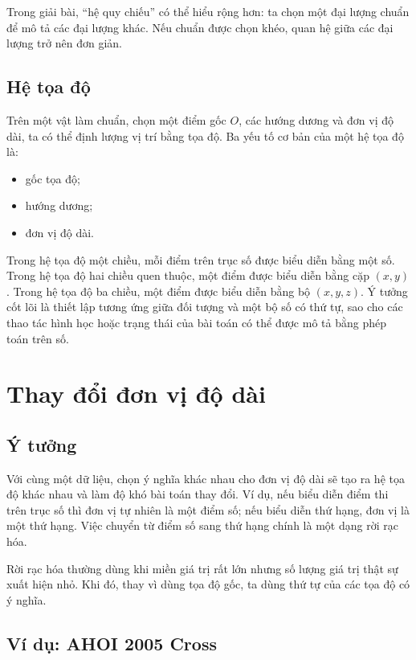 \documentclass[11pt]{article}
\begin{document}
Trong giải bài, ``hệ quy chiếu'' có thể hiểu rộng hơn: ta chọn một đại lượng
chuẩn để mô tả các đại lượng khác. Nếu chuẩn được chọn khéo, quan hệ giữa các
đại lượng trở nên đơn giản.

\subsection{Hệ tọa độ}

Trên một vật làm chuẩn, chọn một điểm gốc \(O\), các hướng dương và đơn vị độ
dài, ta có thể định lượng vị trí bằng tọa độ. Ba yếu tố cơ bản của một hệ tọa
độ là:
\begin{itemize}
  \item gốc tọa độ;
  \item hướng dương;
  \item đơn vị độ dài.
\end{itemize}

Trong hệ tọa độ một chiều, mỗi điểm trên trục số được biểu diễn bằng một số.
Trong hệ tọa độ hai chiều quen thuộc, một điểm được biểu diễn bằng cặp
\((x,y)\). Trong hệ tọa độ ba chiều, một điểm được biểu diễn bằng bộ
\((x,y,z)\). Ý tưởng cốt lõi là thiết lập tương ứng giữa đối tượng và một bộ
số có thứ tự, sao cho các thao tác hình học hoặc trạng thái của bài toán có
thể được mô tả bằng phép toán trên số.

\section{Thay đổi đơn vị độ dài}

\subsection{Ý tưởng}

Với cùng một dữ liệu, chọn ý nghĩa khác nhau cho đơn vị độ dài sẽ tạo ra hệ
tọa độ khác nhau và làm độ khó bài toán thay đổi. Ví dụ, nếu biểu diễn điểm
thi trên trục số thì đơn vị tự nhiên là một điểm số; nếu biểu diễn thứ hạng,
đơn vị là một thứ hạng. Việc chuyển từ điểm số sang thứ hạng chính là một dạng
rời rạc hóa.

Rời rạc hóa thường dùng khi miền giá trị rất lớn nhưng số lượng giá trị thật
sự xuất hiện nhỏ. Khi đó, thay vì dùng tọa độ gốc, ta dùng thứ tự của các tọa
độ có ý nghĩa.

\subsection{Ví dụ: AHOI 2005 Cross}
\end{document}

